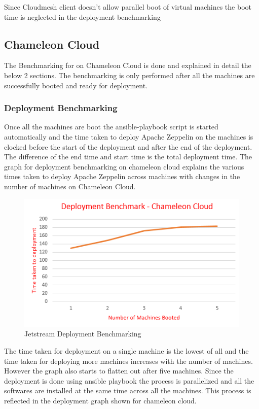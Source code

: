 \documentclass[9pt,twocolumn,twoside]{../../styles/osajnl}
\begin{document}
	Since Cloudmesh client doesn't allow parallel boot of virtual 
	machines the boot time is neglected in the deployment benchmarking
	
	\subsection{Chameleon Cloud}
	
	The Benchmarking for on Chameleon Cloud is done and explained in 
	detail the below 2 sections. The benchmarking is only performed 
	after 
	all the machines are successfully booted and ready for deployment.
	
	\subsubsection{Deployment Benchmarking}
	
	Once all the machines are boot the ansible-playbook script is 
	started 
	automatically and the time taken to deploy Apache Zeppelin on the 
	machines is clocked before the start of the deployment and after 
	the 
	end of the deployment. The difference of the end time and start 
	time 
	is the total deployment time. The graph for deployment 
	benchmarking 
	on chameleon cloud explains the various 
	times taken to deploy Apache Zeppelin across machines with 
	changes in 
	the number of machines on Chameleon Cloud.
	
	\begin{figure}
		\includegraphics[width=\linewidth]{./images/chameleon_deployment_time}
		\caption{Jetstream Deployment Benchmarking}
		\label{fig:Chameleon Deployment Benchmarking}
	\end{figure}
	
	The time taken for deployment on a single machine is the lowest 
	of 
	all and the time taken for deploying more machines increases with 
	the 
	number of machines. However the graph also starts to flatten out 
	after five machines. Since the deployment is done using ansible 
	playbook the process is parallelized and all the softwares are 
	installed at the same time across all the machines. This 
	process 
	is reflected in the deployment graph shown for chameleon cloud.
	
\end{document}

